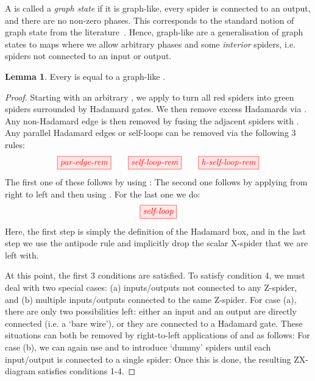 \documentclass[a4paper,onecolumn,superscriptaddress,11pt,accepted=2020-04-27]{quantumarticle}
\theoremstyle{definition}
\newtheorem{lemma}[theorem]{Lemma}
\begin{document}
A \zxdiagram is called a \textit{graph state} if it is graph-like, every spider is connected to an output, and there are no non-zero phases. This corresponds to the standard notion of graph state from the literature~\cite{hein2006entanglement}. Hence, graph-like \zxdiagrams are a generalisation of graph states to maps where we allow arbitrary phases and some \textit{interior} spiders, i.e. spiders not connected to an input or output.

\begin{lemma}\label{lem:all-zx-are-graph-like}
  Every \zxdiagram is equal to a graph-like \zxdiagram.
\end{lemma}
\begin{proof} Starting with an arbitrary \zxdiagram, we apply \HadamardRule to turn all red spiders into green spiders surrounded by Hadamard gates. We then remove excess Hadamards via \HCancelRule. Any non-Hadamard edge is then removed by fusing the adjacent spiders with \SpiderRule. Any parallel Hadamard edges or self-loops can be removed via the following 3 rules:
\begin{equation}\label{eq:parallel-edges-loops}
\tikzfig{par-edge-rem} \qquad
\tikzfig{self-loop-rem} \qquad
\tikzfig{h-self-loop-rem}
\end{equation}
The first one of these follows by using \HopfRule:
The second one follows by applying \IdentityRule from right to left and then using \SpiderRule. For the last one we do:
\begin{equation*}
\tikzfig{self-loop}
\end{equation*}
Here, the first step is simply the definition of the Hadamard box, and in the last step we use the antipode rule \HopfRule and implicitly drop the scalar X-spider that we are left with.

At this point, the first 3 conditions are satisfied. To satisfy condition 4, we must deal with two special cases: (a) inputs/outputs not connected to any Z-spider, and (b) multiple inputs/outputs connected to the same Z-spider. For case (a), there are only two possibilities left: either an input and an output are directly connected (i.e. a `bare wire'), or they are connected to a Hadamard gate. These situations can both be removed by right-to-left applications of \IdentityRule and \HHRule as follows:
For case (b), we can again use \IdentityRule and \HHRule to introduce `dummy' spiders until each input/output is connected to a single spider:
Once this is done, the resulting ZX-diagram satisfies conditions 1-4.
\end{proof}
\end{document}
